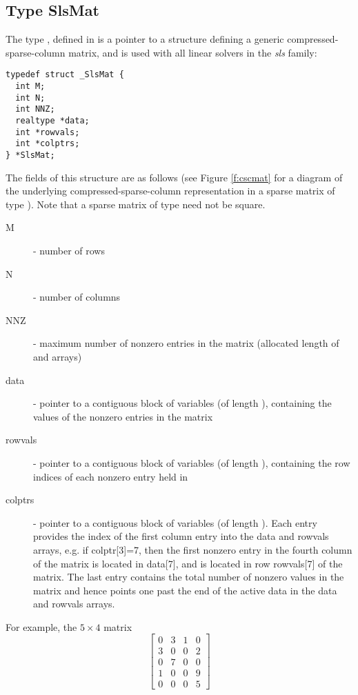 \subsection{Type SlsMat}
The type , defined in  is a pointer to a 
structure defining a generic compressed-sparse-column matrix, and is
used with all linear solvers in the {\em sls} family:
\begin{verbatim}
typedef struct _SlsMat {
  int M;
  int N;
  int NNZ;
  realtype *data;
  int *rowvals;
  int *colptrs;
} *SlsMat;
\end{verbatim}
The fields of this structure are as follows (see Figure \ref{f:cscmat}
for a diagram of the underlying compressed-sparse-column
representation in a sparse matrix of type ).  Note that a
sparse matrix of type  need not be square.
\begin{description}
  \item[M]  - number of rows
  \item[N]  - number of columns
  \item[NNZ]  - maximum number of nonzero entries in the matrix
    (allocated length of  and  arrays)
  \item[data]  - pointer to a contiguous block of 
    variables (of length ), containing the values of the
    nonzero entries in the matrix
  \item[rowvals] - pointer to a contiguous block of  variables
    (of length ), containing the row indices of each nonzero
    entry held in 
  \item[colptrs]  - pointer to a contiguous block of 
    variables (of length ). Each entry provides the index of
    the first column entry into the {\id data} and {\id rowvals}
    arrays, e.g. if {\id colptr[3]=7}, then the first nonzero entry in
    the fourth column of the matrix is located in {\id data[7]}, and
    is located in row {\id rowvals[7]} of the matrix.  The last entry
    contains the total number of nonzero values in the matrix and hence
    points one past the end of the active data in the {\id data} and
    {\id rowvals} arrays.
\end{description}
For example, the $5\times 4$ matrix
\[
  \left[\begin{array}{cccc} 
     0 & 3 & 1 & 0\\
     3 & 0 & 0 & 2\\
     0 & 7 & 0 & 0\\
     1 & 0 & 0 & 9\\
     0 & 0 & 0 & 5
  \end{array}\right]
\]
